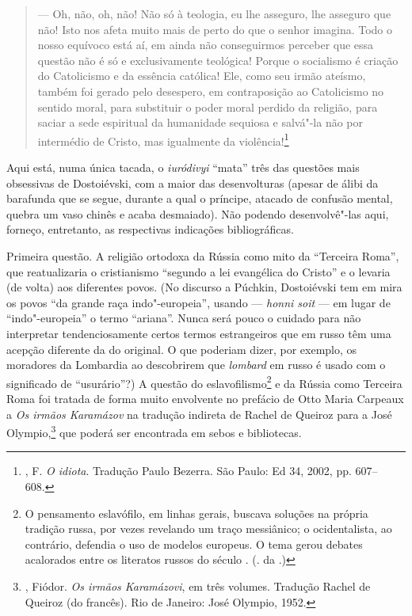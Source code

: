 \begin{quotation}
--- Oh, não, oh, não! Não só à teologia, eu lhe asseguro, lhe asseguro que não! Isto nos afeta muito mais de perto do que o senhor
imagina. Todo o nosso equívoco está aí, em ainda não conseguirmos perceber que essa questão não é só e exclusivamente teológica! Porque o socialismo é criação do Catolicismo e da essência católica! Ele, como seu irmão ateísmo, também foi gerado pelo desespero, em contraposição ao Catolicismo no sentido moral, para substituir o poder moral perdido da religião, para saciar a sede espiritual da humanidade sequiosa e salvá"-la não por intermédio de Cristo, mas igualmente da violência!\footnote{, F. \emph{O idiota}. Tradução Paulo Bezerra. São Paulo: Ed 34, 2002, pp. 607--608.}
\end{quotation}

Aqui está, numa única tacada, o \emph{iuródivyi} ``mata'' três das questões mais obsessivas de Dostoiévski, com a maior das desenvolturas (apesar de álibi da barafunda que se segue, durante a qual o príncipe, atacado de confusão mental, quebra um vaso chinês e acaba desmaiado). Não podendo desenvolvê"-las aqui, forneço, entretanto, as respectivas indicações bibliográficas.

Primeira questão. A religião ortodoxa da Rússia como mito da
``Terceira Roma'', que reatualizaria o cristianismo ``segundo
a lei evangélica do Cristo'' e o levaria (de volta) aos
diferentes povos. (No discurso a Púchkin, Dostoiévski tem em
mira os povos ``da grande raça indo"-europeia'', usando ---
\emph{honni soit} --- em lugar de ``indo"-europeia'' o termo
``ariana''. Nunca será pouco o cuidado para não interpretar
tendenciosamente certos termos estrangeiros que em russo têm
uma acepção diferente da do original. O que poderiam dizer,
por exemplo, os moradores da Lombardia ao descobrirem que
\emph{lombard} em russo é usado com o significado de
``usurário''?) A questão do eslavofilismo\footnote{O
pensamento eslavófilo, em linhas gerais, buscava soluções
na própria tradição russa, por vezes revelando um traço
messiânico; o ocidentalista, ao contrário, defendia o uso
de modelos europeus. O tema gerou debates acalorados entre
os literatos russos do século . (. da .)} e
da Rússia como Terceira Roma foi tratada de forma muito
envolvente no prefácio de Otto Maria Carpeaux a \emph{Os
irmãos Karamázov} na tradução indireta de Rachel de Queiroz
para a José Olympio,\footnote{, Fiódor.
\emph{Os irmãos Karamázovi}, em três volumes. Tradução Rachel
de Queiroz (do francês). Rio de Janeiro: José Olympio, 1952.}
que poderá ser encontrada em sebos e bibliotecas.

